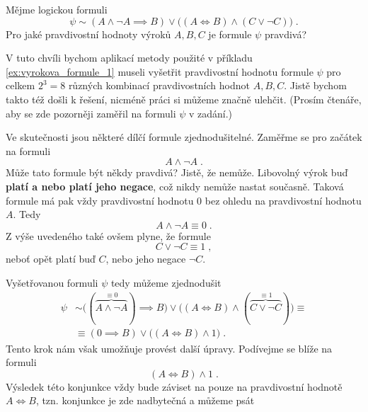 \begin{example}\label{ex:vyrokova_formule_2}
    Mějme logickou formuli
    \begin{equation*}
        \psi\sim (A \land \neg A \implies B) \lor \big((A \iff B) \land (C \lor \neg C)\big)\; .
    \end{equation*}
    Pro jaké pravdivostní hodnoty výroků $A,B,C$ je formule $\psi$ pravdivá?
    \begin{solution}
        V tuto chvíli bychom aplikací metody použité v příkladu \ref{ex:vyrokova_formule_1} museli vyšetřit pravdivostní hodnotu formule $\psi$ pro celkem $2^3=8$ různých kombinací pravdivostních hodnot $A,B,C$. Jistě bychom takto též došli k řešení, nicméně práci si můžeme značně ulehčit. (Prosím čtenáře, aby se zde pozorněji zaměřil na formuli $\psi$ v zadání.)\par
        Ve skutečnosti jsou některé dílčí formule zjednodušitelné. Zaměřme se pro začátek na formuli
        \begin{equation*}
            A \land \neg A\; .
        \end{equation*}
        Může tato formule být někdy pravdivá? Jistě, že nemůže. Libovolný výrok buď \textbf{platí a nebo platí jeho negace}, což nikdy nemůže nastat současně. Taková formule má pak vždy pravdivostní hodnotu 0 bez ohledu na pravdivostní hodnotu $A$. Tedy
        \begin{equation*}
            A \land \neg A\equiv 0\; .
        \end{equation*}
        Z výše uvedeného také ovšem plyne, že formule
        \begin{equation*}
            C \lor \neg C\equiv 1\; ,
        \end{equation*}
        neboť opět platí buď $C$, nebo jeho negace $\neg C$.\par
        Vyšetřovanou formuli $\psi$ tedy můžeme zjednodušit
        \begin{align*}
            \psi&\sim \big((\overbrace{A \land \neg A}^{\equiv 0}) \implies B\big) \lor \big((A \iff B) \land (\overbrace{C \lor \neg C}^{\equiv 1})\big)\equiv  \\ &\equiv (0 \implies B) \lor \big((A \iff B) \land 1\big)\; .
        \end{align*}
        Tento krok nám však umožňuje provést další úpravy. Podívejme se blíže na formuli
        \begin{equation*}
            (A \iff B) \land 1\; .
        \end{equation*}
        Výsledek této konjunkce vždy bude záviset na pouze na pravdivostní hodnotě $A \iff B$, tzn. konjunkce je zde nadbytečná a můžeme psát

\end{solution}
\end{example}
